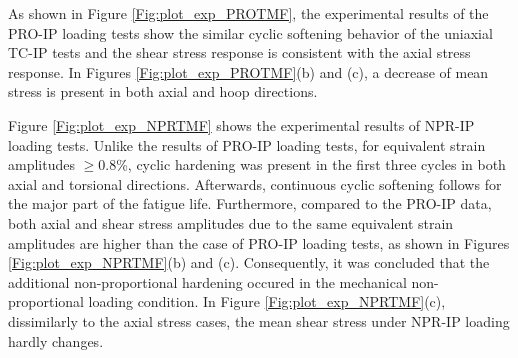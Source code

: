 \documentclass[preprint,5p,twocolumn,11pt,sort&compress]{elsarticle}
\begin{document}
As shown in Figure \ref{Fig:plot_exp_PROTMF}, the experimental results of the PRO-IP loading tests show the similar cyclic softening behavior of the uniaxial TC-IP tests and the shear stress response is consistent with the axial stress response. In Figures \ref{Fig:plot_exp_PROTMF}(b) and (c), a decrease of mean stress is present in both axial and hoop directions.


Figure \ref{Fig:plot_exp_NPRTMF} shows the experimental results of NPR-IP loading tests. Unlike the results of PRO-IP loading tests, for equivalent strain amplitudes $\geqslant$0.8\%, cyclic hardening was present in the first three cycles in both axial and torsional directions. Afterwards, continuous cyclic softening follows for the major part of the fatigue life. Furthermore, compared to the PRO-IP data, both axial and shear stress amplitudes due to the same equivalent strain amplitudes are higher than the case of PRO-IP loading tests, as shown in Figures \ref{Fig:plot_exp_NPRTMF}(b) and (c). Consequently, it was concluded that the additional non-proportional hardening occured in the mechanical non-proportional loading condition. In Figure \ref{Fig:plot_exp_NPRTMF}(c), dissimilarly to the axial stress cases, the  mean  shear stress under NPR-IP loading hardly changes.




\end{document}
